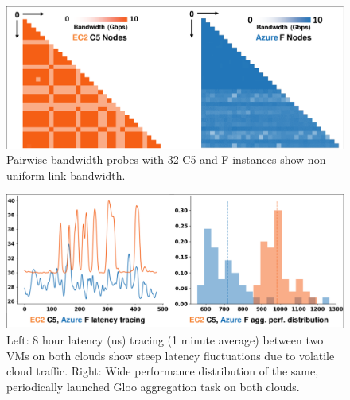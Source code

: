 
\begin{figure}[t!]
	\centering
	\includegraphics[width=.7\linewidth, trim=3 3 3 3,clip]{Figures/dcnetworkcondition.pdf}
	\caption{Pairwise bandwidth probes with 32 \ectwo C5 and \azure F instances show non-uniform link bandwidth.}
	\label{fig:dcnetworkcondition}
\end{figure}

\begin{figure}[t!]
	\centering
	\includegraphics[width=.7\linewidth, trim=3 3 3 3,clip]{Figures/perfFluctuation.pdf}
	\caption{Left: 8 hour latency (us) tracing (1 minute average) between two VMs on both clouds show steep latency fluctuations due to volatile cloud traffic. Right: Wide performance distribution of the same, periodically launched Gloo aggregation task on both clouds.}
	\label{fig:perfFluctuation}
\end{figure}


